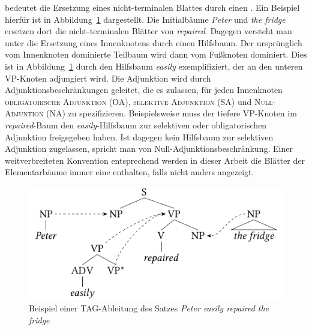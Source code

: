  bedeutet die Ersetzung eines nicht-terminalen Blattes durch einen . Ein Beispiel hierfür ist in Abbildung~\ref{fig-TAG-bsp1} dargestellt. Die Initialbäume {\it Peter} und {\it the fridge} ersetzen dort die nicht-terminalen Blätter von {\it repaired}. Dagegen versteht man unter  die Ersetzung eines Innenknotens durch einen Hilfsbaum. Der ursprünglich vom Innenknoten dominierte Teilbaum wird dann vom Fu\ss knoten dominiert. Dies ist in Abbildung~\ref{fig-TAG-bsp1} durch den Hilfsbaum {\it easily} exemplifiziert, der an den unteren VP-Knoten adjungiert wird. Die Adjunktion wird durch Adjunktionsbeschränkungen geleitet, die es zulassen, für jeden Innenknoten \textsc{obligatorische Adjunktion (OA)}, \textsc{selektive Adjunktion (SA)} und \textsc{Null-Adjuntion (NA)} zu spezifizieren. Beispielsweise muss der tiefere VP-Knoten im {\it repaired}-Baum den {\it easily}-Hilfsbaum zur selektiven oder obligatorischen Adjunktion freigegeben haben. Ist dagegen kein Hilfsbaum zur selektiven Adjunktion zugelassen, spricht man von Null-Adjunktionsbeschrän\-kung. Einer weitverbreiteten Konvention entsprechend werden in dieser Arbeit die Blätter der Elementarbäume immer eine  enthalten, falls nicht anders angezeigt.
\begin{figure}[t]
\centering
\includegraphics{graphics/abb51.pdf}
\caption{\label{fig-TAG-bsp1}Beispiel einer TAG-Ableitung des Satzes {\it Peter easily repaired the fridge}}
\end{figure}

